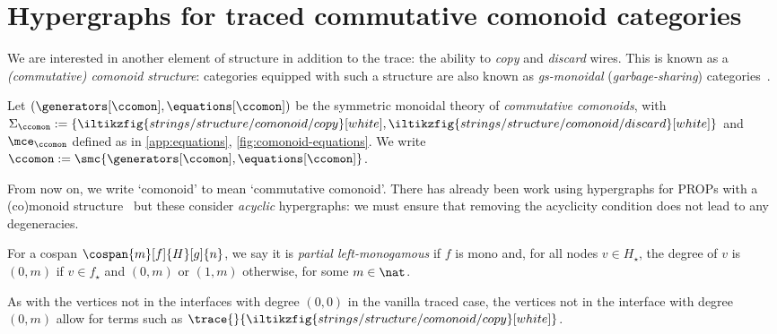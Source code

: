 \section{Hypergraphs for traced commutative comonoid categories}

We are interested in another element of structure in addition to the trace: the
ability to \emph{copy} and \emph{discard} wires.
This is known as a \emph{(commutative) comonoid structure}: categories equipped
with such a structure are also known as \emph{gs-monoidal}
(\emph{garbage-sharing}) categories~\cite{fritz2022free}.

\begin{definition}
    Let \((\generators[\ccomon], \equations[\ccomon])\) be the symmetric
    monoidal theory of \emph{commutative comonoids}, with \(\Sigma_\ccomon := \{
        \iltikzfig{strings/structure/comonoid/copy}[white],
        \iltikzfig{strings/structure/comonoid/discard}[white]
    \}\) and \(\mce_\ccomon\) defined as in \cref{app:equations},
    \cref{fig:comonoid-equations}.
    We write \(\ccomon := \smc{\generators[\ccomon], \equations[\ccomon]}\).
\end{definition}

From now on, we write `comonoid' to mean `commutative comonoid'.
There has already been work using hypergraphs for PROPs with a (co)monoid
structure~\cite{fritz2022free,milosavljevic2022string} but these consider
\emph{acyclic} hypergraphs: we must ensure that removing the acyclicity
condition does not lead to any degeneracies.

\begin{definition}
    For a cospan \(\cospan{m}[f]{H}[g]{n}\), we say it is
    \emph{partial left-monogamous} if \(f\) is mono and, for all nodes
    \(v \in H_\star\), the degree of \(v\) is \((0,m)\) if \(v \in f_\star\) and
    \((0,m)\) or \((1,m)\) otherwise, for some \(m \in \nat\).
\end{definition}

\begin{remark}
    As with the vertices not in the interfaces with degree \((0, 0)\) in the
    vanilla traced case, the vertices not in the interface with degree
    \((0, m)\) allow for terms such as \(
        \trace{}{\iltikzfig{strings/structure/comonoid/copy}[white]}
    \).
\end{remark}

